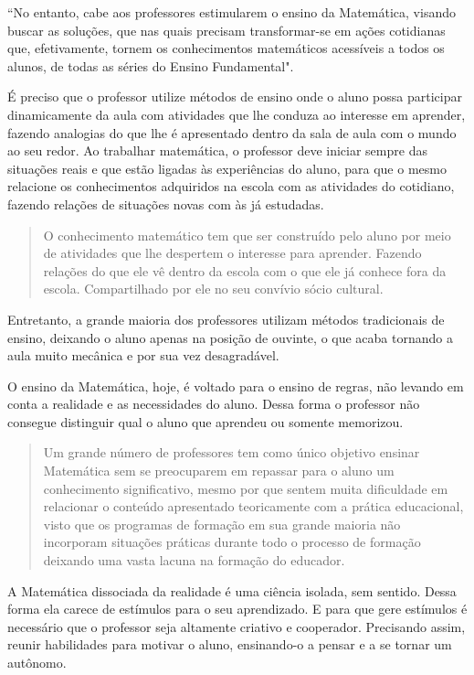 \documentclass[12pt,a4paper]{article}
\begin{document}
``No entanto, cabe aos professores estimularem o ensino da Matemática, visando buscar as soluções, que nas quais precisam transformar-se em ações cotidianas que, efetivamente, tornem os conhecimentos matemáticos acessíveis a todos os alunos, de todas as séries do Ensino Fundamental". \citep{henrique2004}

É preciso que o professor utilize métodos de ensino onde o aluno possa participar dinamicamente da aula com atividades que lhe conduza ao interesse em aprender, fazendo analogias do que lhe é apresentado dentro da sala de aula com o mundo ao seu redor.
Ao trabalhar matemática, o professor deve iniciar sempre das situações reais e que estão ligadas às experiências do aluno, para que o mesmo relacione os conhecimentos adquiridos na escola com as atividades do cotidiano, fazendo relações de situações novas com às já estudadas.\citep{henrique2004}

\begin{quote}
O conhecimento matemático tem que ser construído pelo aluno por meio de atividades que lhe despertem o interesse para aprender. Fazendo relações do que ele vê dentro da escola com o que ele já conhece fora da escola. Compartilhado por ele no seu convívio sócio cultural. \citep{santos2008ensino} 
\end{quote}

Entretanto, a grande maioria dos professores utilizam métodos tradicionais de ensino, deixando o aluno apenas na posição de ouvinte, o que acaba tornando a aula muito mecânica e por sua vez desagradável.

O ensino da Matemática, hoje, é voltado para o ensino de regras, não levando em conta a realidade e as necessidades do aluno. Dessa forma o professor não consegue distinguir qual o aluno que aprendeu ou somente memorizou. \citep{henrique2004}

\begin{quote}
Um grande número de professores tem como único objetivo ensinar Matemática sem se preocuparem em repassar para o aluno um conhecimento significativo, mesmo por que sentem muita dificuldade em relacionar o conteúdo apresentado teoricamente com a prática educacional, visto que os programas de formação em sua grande maioria não incorporam situações práticas durante todo o processo de formação deixando uma vasta lacuna na formação do educador. \citep{info}
\end{quote}

A Matemática dissociada da realidade é uma ciência isolada, sem sentido. Dessa forma ela carece de estímulos para o seu aprendizado. E para que gere estímulos é necessário que o professor seja altamente criativo e cooperador. Precisando assim, reunir habilidades para motivar o aluno, ensinando-o a pensar e a se tornar um autônomo. \citep{silva2005refletindo}
\end{document}
